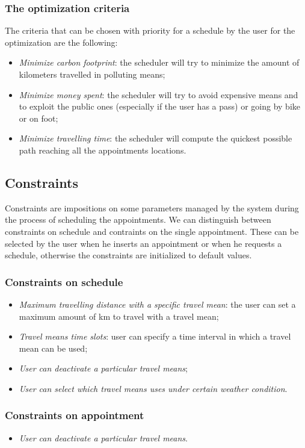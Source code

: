 \subsubsection{The optimization criteria} \label{subsubsect:optcriteria} 
The criteria that can be chosen with priority for a schedule by the user  for the optimization are the following:
\begin{itemize}
\item \textit{Minimize carbon footprint}: the scheduler will try to minimize the amount of kilometers travelled in polluting means;
\item \textit{Minimize money spent}: the scheduler will try to avoid expensive means and to exploit the public ones (especially if the user has a pass) or going by bike or on foot;
\item \textit{Minimize travelling time}: the scheduler will compute the quickest possible path reaching all the appointments locations.
\end{itemize}

\subsection{Constraints}
Constraints are impositions on some parameters managed by the system during the process of scheduling the appointments. We can distinguish between constraints on schedule and contraints on the single appointment. These can be selected by the user when he inserts an appointment or when he requests a schedule, otherwise the constraints are initialized to default values. 

\subsubsection{Constraints on schedule} 
\begin{itemize}
\item \textit{Maximum travelling distance with a specific travel mean}: the user can set a maximum amount of km to travel with a travel mean;
\item\textit{ Travel means time slots}: user can specify a time interval in which a travel mean can be used;
\item \textit{User can deactivate a particular travel means};
\item \textit{User can select which travel means uses under certain weather condition}.
\end{itemize}

\subsubsection{Constraints on appointment} \label{subsubsect:constronappoint}
\begin{itemize}
\item \textit{User can deactivate a particular travel means}.
\end{itemize}

